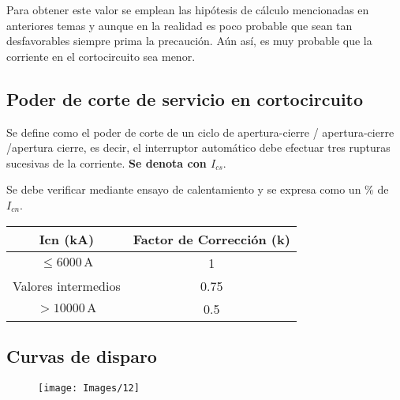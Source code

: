 Para obtener este valor se emplean las hipótesis de cálculo mencionadas en anteriores temas y aunque en la realidad es poco probable que sean tan desfavorables siempre prima la precaución. Aún así, es muy probable que la corriente en el cortocircuito sea menor.

\subsection{Poder de corte de servicio en cortocircuito}
Se define como el poder de corte de un ciclo de apertura-cierre / apertura-cierre /apertura cierre, es decir, el interruptor automático debe efectuar tres rupturas sucesivas de la corriente. \textbf{Se denota con $I_{cs}$}.
\newline

Se debe verificar mediante ensayo de calentamiento y se expresa como un \% de $I_{cn}$.
\begin{table}[H]
	\centering
	\begin{tabular}{|c|c|}
		\hline
		\textbf{Icn (kA)} & \textbf{Factor de Corrección (k)} \\ \hline
		$\leq 6000 \, \text{A}$    & 1    \\ \hline
		Valores intermedios & 0.75 \\ \hline
		$> 10000 \, \text{A}$  & 0.5   \\ \hline
	\end{tabular}
\end{table}
\subsection{Curvas de disparo}
\begin{figure}[H]
	\centering
	\texttt{[image: Images/12]}
	\label{fig:12}
\end{figure}

